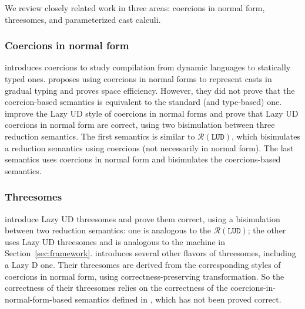 \documentclass[runningheads]{llncs}
\newcommand{\RMachine}[1]{\ensuremath{\mathcal{R}(#1)}}
\newcommand{\LUDMachine}{\RMachine{\BLUD}}
\newcommand{\BLUD}[0]{\ensuremath{\mathtt{LUD}}}
\begin{document}
We review closely related work in three areas: coercions in normal
form, threesomes, and parameterized cast calculi.

\subsubsection{Coercions in normal form}

\citet{henglein1994dynamic} introduces coercions to study compilation
from dynamic languages to statically typed
ones. \citet{herman2010space} proposes using coercions in normal forms
to represent casts in gradual typing and proves space efficiency.
However, they did not prove that the coercion-based semantics is
equivalent to the standard (and type-based)
one. \citet{Siek:2015:BCT:2737924.2737968} improve the Lazy UD style
of coercions in normal forms and prove that Lazy UD coercions in
normal form are correct, using two bisimulation between three
reduction semantics. The first semantics is similar to \LUDMachine,
which bisimulates a reduction semantics using coercions (not
necessarily in normal form). The last semantics uses coercions in
normal form and bisimulates the coercions-based semantics.


\subsubsection{Threesomes}

\citet{Siek:2010:TWB:1706299.1706342} introduce Lazy UD threesomes and
prove them correct, using a bisimulation between two reduction
semantics: one is analogous to the \LUDMachine; the other uses Lazy UD
threesomes and is analogous to the machine in
Section~\ref{sec:framework}.  \citet{Garcia:2013:CTB:2500365.2500603}
introduces several other flavors of threesomes, including a Lazy D
one. Their threesomes are derived from the corresponding styles of
coercions in normal form, using correctness-preserving
transformation. So the correctness of their threesomes relies on the
correctness of the coercions-in-normal-form-based semantics defined in
\citet{herman2010space}, which has not been proved correct.

\end{document}
